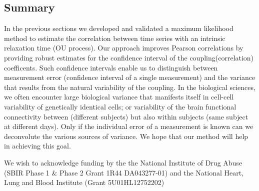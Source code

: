 \documentclass[%
 reprint,
 amsmath,amssymb,
 aps,
]{revtex4-1}
\begin{document}
\subsection{Summary}
In the previous sections we developed and validated a maximum likelihood method to estimate the correlation between time series with an intrinsic relaxation time (OU process).  Our approach improves Pearson correlations by providing robust estimates for the confidence interval of the coupling(correlation) coefficents.  Such confidence intervals enable us to distinguish between measurement error (confidence interval of a single measurement) and the variance that results from the natural variability of the coupling.  In the biological sciences, we often encounter large biological variance that manifests itself in cell-cell variability of genetically identical cells; or variability of the brain functional connectivity between (different subjects) but also within subjects (same subject at different days).  Only if the individual error of a measurement is known can we deconvolute the various sources of variance.  We hope that our method will help in achieving this goal.
\begin{acknowledgments}
We wish to acknowledge funding by the the National Institute of Drug Abuse (SBIR Phase 1 \& Phase 2 Grant 1R44 DA043277-01) and the National Heart, Lung and Blood Institute (Grant 5U01HL12752202)
\end{acknowledgments}

\end{document}
